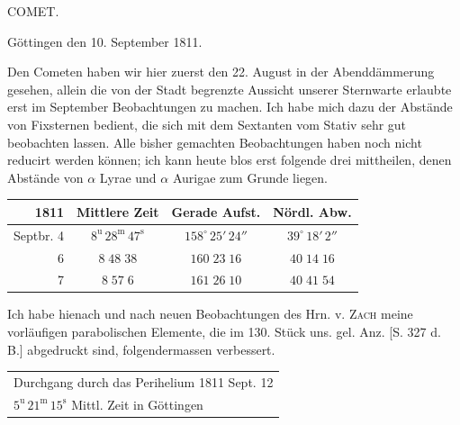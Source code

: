 \par{}\bigskip
\hypertarget{native-338-lower}{}\label{native-338-lower}
\begin{center}
\large COMET.
\end{center}

\begin{flushright}Göttingen den 10. September 1811.\end{flushright}
\par\indent Den Cometen haben wir hier zuerst den 22. August in der Abenddämmerung gesehen, allein die von der Stadt begrenzte Aussicht unserer Sternwarte erlaubte erst im September Beobachtungen zu machen. Ich habe mich dazu der Abstände von Fixsternen bedient, die sich mit dem Sextanten vom Stativ sehr gut beobachten lassen. Alle bisher gemachten Beobachtungen haben noch nicht reducirt werden können; ich kann heute blos erst folgende drei mittheilen, denen Abstände von $\alpha$ Lyrae und $\alpha$ Aurigae zum Grunde liegen.
\begin{center}\fontsize{10}{12}\selectfont\setlength{\tabcolsep}{4pt}\renewcommand{\arraystretch}{1.15}\begin{tabular}{r|c|c|c}
1811 & Mittlere Zeit & Gerade Aufst. & Nördl. Abw.\\
\hline
Septbr. 4 & $8^{\mathrm u}\,28^{\mathrm m}\,47^{\mathrm s}$ & $158^\circ\,25'\,24''$ & $39^\circ\,18'\,2''$\\
6 & $8\;48\;38$ & $160\;23\;16$ & $40\;14\;16$\\
7 & $8\;57\;6$ & $161\;26\;10$ & $40\;41\;54$\\
\end{tabular}\end{center}

\par\indent Ich habe hienach und nach neuen Beobachtungen des Hrn. v. \textsc{Zach} meine vorläufigen parabolischen Elemente, die im 130. Stück uns. gel. Anz. [S. 327 d. B.] abgedruckt sind, folgendermassen verbessert.
\begin{center}\fontsize{10}{12}\selectfont\setlength{\tabcolsep}{4pt}\renewcommand{\arraystretch}{1.15}\begin{tabular}{l}
Durchgang durch das Perihelium 1811 Sept. 12\\
\quad $5^{\mathrm u}\,21^{\mathrm m}\,15^{\mathrm s}$ Mittl. Zeit in Göttingen\\
\end{tabular}\end{center}

